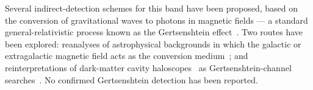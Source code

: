 Several indirect-detection schemes for this band have been
proposed, based on the conversion of gravitational waves to
photons in magnetic fields --- a standard general-relativistic
process known as the Gertsenshtein
effect~\cite{gertsenshtein1962wave, boccaletti1970conversion}.
Two routes have been explored: reanalyses of astrophysical
backgrounds in which the galactic or extragalactic magnetic
field acts as the conversion
medium~\cite{lella2024constraining, Domcke:2020yzq}; and
reinterpretations of dark-matter cavity
haloscopes~\cite{ADMX:2025vom, HAYSTAC:2025nrt, Salemi:2019xgl}
as Gertsenshtein-channel
searches~\cite{Berlin:2021txa, Domcke:2022rgu}. No confirmed
Gertsenshtein detection has been reported.
